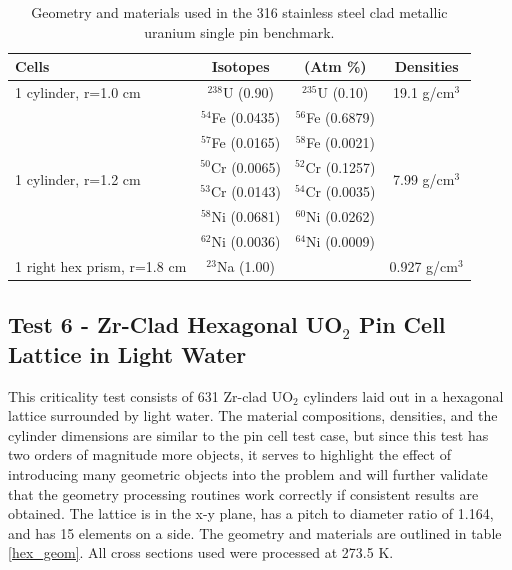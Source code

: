 \documentclass[preprint,12pt]{elsarticle}
\begin{document}
\begin{table}[h]
\centering
\caption{Geometry and materials used in the 316 stainless steel clad metallic uranium single pin benchmark.}
\label{sodium_geom}
\begin{tabular}{| l | c  c  | c |}
\hline
Cells & Isotopes & (Atm \%)     & Densities \\
\hline
\multirow{1}{*}{1 cylinder, r=1.0 cm }   &  $^{238}$U   (0.90)   & $^{235}$U   (0.10)   &    \multirow{1}{*}{19.1 g/cm$^3$} \\
\hline
\multirow{6}{*}{1 cylinder, r=1.2 cm }   &  $^{54}$Fe  (0.0435) & $^{56}$Fe  (0.6879)  &   \multirow{6}{*}{7.99 g/cm$^3$} \\
                                         &  $^{57}$Fe  (0.0165) & $^{58}$Fe  (0.0021)  &   \\
                                         &  $^{50}$Cr  (0.0065) & $^{52}$Cr  (0.1257)  &   \\
                                         &  $^{53}$Cr  (0.0143) & $^{54}$Cr  (0.0035)  &   \\
                                         &  $^{58}$Ni  (0.0681) & $^{60}$Ni  (0.0262)  &   \\
                                         &  $^{62}$Ni  (0.0036) &  $^{64}$Ni  (0.0009) &   \\
\hline
1 right hex prism, r=1.8 cm              &  $^{23}$Na   (1.00)  &                      &    0.927 g/cm$^3$ \\
\hline
\end{tabular}
\end{table}


\subsection{Test 6 - Zr-Clad Hexagonal UO$_2$ Pin Cell Lattice in Light Water}

This criticality test consists of 631 Zr-clad UO$_2$ cylinders laid out in a hexagonal lattice surrounded by light water.  The material compositions, densities, and the cylinder dimensions are similar to the pin cell test case, but since this test has two orders of magnitude more objects, it serves to highlight the effect of introducing many geometric objects into the problem and will further validate that the geometry processing routines work correctly if consistent results are obtained.  The lattice is in the x-y plane, has a pitch to diameter ratio of 1.164, and has 15 elements on a side.  The geometry and materials are outlined in table \ref{hex_geom}.  All cross sections used were processed at 273.5 K.
\end{document}
